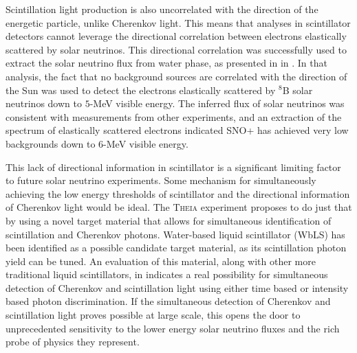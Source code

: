 Scintillation light production is also uncorrelated with the direction of the energetic particle, unlike Cherenkov light.
This means that analyses in scintillator detectors cannot leverage the directional correlation between electrons elastically scattered by solar neutrinos.
This directional correlation was successfully used to extract the solar neutrino flux from {\snop} water phase, as presented in in .
In that analysis, the fact that no background sources are correlated with the direction of the Sun was used to detect the electrons elastically scattered by $^8$B solar neutrinos down to $5$-MeV visible energy.
The inferred flux of solar neutrinos was consistent with measurements from other experiments, and an extraction of the spectrum of elastically scattered electrons indicated SNO+ has achieved very low backgrounds down to $6$-MeV visible energy.

This lack of directional information in scintillator is a significant limiting factor to future solar neutrino experiments.
Some mechanism for simultaneously achieving the low energy thresholds of scintillator and the directional information of Cherenkov light would be ideal.
The \textsc{Theia} experiment proposes to do just that by using a novel target material that allows for simultaneous identification of scintillation and Cherenkov photons.
Water-based liquid scintillator (WbLS) has been identified as a possible candidate target material, as its scintillation photon yield can be tuned.
An evaluation of this material, along with other more traditional liquid scintillators, in  indicates a real possibility for simultaneous detection of Cherenkov and scintillation light using either time based or intensity based photon discrimination.
If the simultaneous detection of Cherenkov and scintillation light proves possible at large scale, this opens the door to unprecedented sensitivity to the lower energy solar neutrino fluxes and the rich probe of physics they represent.
